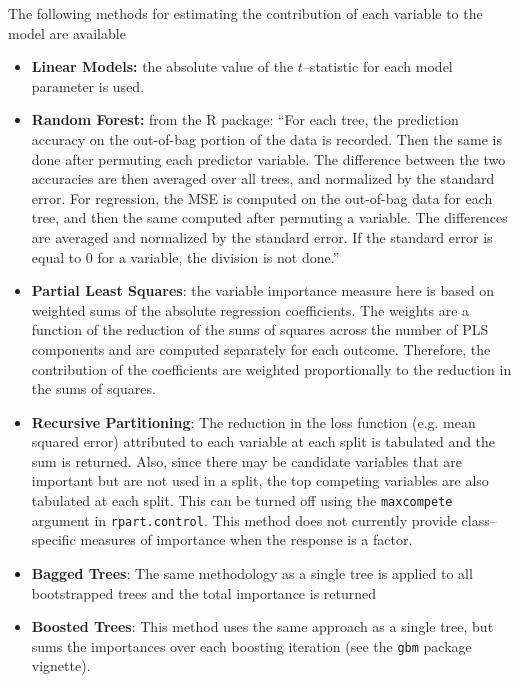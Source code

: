 \documentclass[12pt]{article}
\begin{document}
The following methods for estimating the contribution of each
variable to the model are available
\begin{itemize}

   \item {\bf Linear Models:} the absolute value of the $t$--statistic
   for each model parameter is used.
   
   \item {\bf Random Forest:} from the R package: ``For
     each tree, the prediction accuracy on the out-of-bag portion of
     the data is recorded.  Then the same is done after permuting each
     predictor variable.  The difference between the two accuracies are
     then averaged over all trees, and normalized by the standard
     error.  For regression, the MSE is computed on the out-of-bag data
     for each tree, and then the same computed after permuting a
     variable.  The differences are averaged and normalized by the
     standard error.  If the standard error is equal to 0 for a
     variable, the division is not done.''
   
   \item {\bf Partial Least Squares}: the variable importance measure here is based on 
   weighted sums of the absolute regression coefficients. The weights are a function of
   the reduction of the sums of squares across the number of PLS components and are 
   computed separately for each outcome. Therefore, the contribution of the coefficients
  are weighted proportionally to the reduction in the sums of squares. 
  
   
  \item {\bf Recursive Partitioning}: The reduction in the loss function
  (e.g. mean squared error) attributed to each variable at each split is 
  tabulated and the sum is returned. Also, since there may be candidate variables
  that are important but are not used in a split, the top competing variables are
  also tabulated at each split. This can be turned off using the \texttt{maxcompete}
  argument in \texttt{rpart.control}. This method does not currently provide
  class--specific measures of importance when the response is a factor.
  
  \item {\bf Bagged Trees}: The same methodology as a single tree is applied to 
  all bootstrapped trees and the total importance is returned

  \item {\bf Boosted Trees}: This method uses the same approach as a single
  tree, but sums the importances over each boosting iteration (see the \texttt{gbm} package vignette).
  

\end{itemize}
\end{document}
